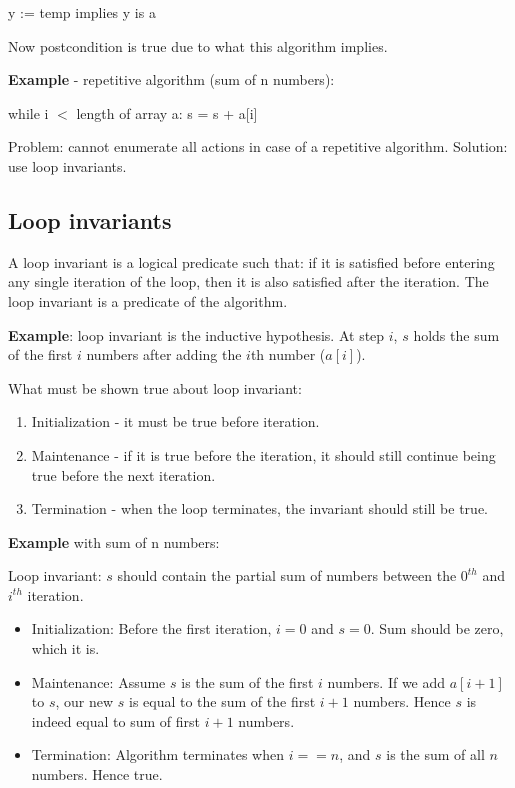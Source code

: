 \documentclass{article}
\begin{document}
y := temp implies y is a

Now postcondition is true due to what this algorithm implies.

\textbf{Example} - repetitive algorithm (sum of n numbers):

while i $<$ length of array a:
s = s + a[i]

Problem: cannot enumerate all actions in case of a repetitive algorithm.
Solution: use loop invariants.

\subsection{Loop invariants}
A loop invariant is a logical predicate such that: if it is satisfied before entering any single iteration of the loop, then it is also satisfied after the iteration. The loop invariant is a predicate of the algorithm.

\textbf{Example}: loop invariant is the inductive hypothesis. At step $i$, $s$ holds the sum of the first $i$ numbers after adding the $i$th number ($a[i]$).

What must be shown true about loop invariant:
\begin{enumerate}
    \item Initialization - it must be true before iteration.
    \item Maintenance - if it is true before the iteration, it should still continue being true before the next iteration.
    \item Termination - when the loop terminates, the invariant should still be true.
\end{enumerate}

\textbf{Example} with sum of n numbers:

Loop invariant: $s$ should contain the partial sum of numbers between the $0^{th}$ and $i^{th}$ iteration.

\begin{itemize}
    \item Initialization: Before the first iteration, $i = 0$ and $s = 0$. Sum should be zero, which it is.
    \item Maintenance: Assume $s$ is the sum of the first $i$ numbers. If we add $a[i + 1]$ to $s$, our new $s$ is equal to the sum of the first $i + 1$ numbers. Hence $s$ is indeed equal to sum of first $i+1$ numbers.
    \item Termination: Algorithm terminates when $i == n$, and $s$ is the sum of all $n$ numbers. Hence true.
\end{itemize}
\end{document}
